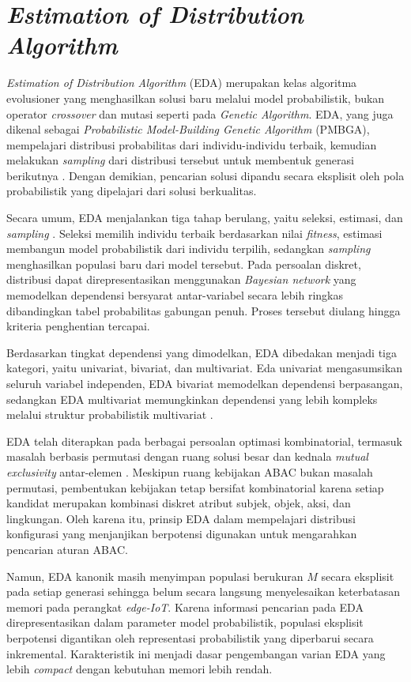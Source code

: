\section{\textit{Estimation of Distribution Algorithm}}

\textit{Estimation of Distribution Algorithm} (EDA) merupakan kelas algoritma evolusioner yang menghasilkan solusi baru melalui model probabilistik, bukan operator \textit{crossover} dan mutasi seperti pada \textit{Genetic Algorithm}.
EDA, yang juga dikenal sebagai \textit{Probabilistic Model-Building Genetic Algorithm} (PMBGA)\label{first:pmbga}, mempelajari distribusi probabilitas dari individu-individu terbaik, kemudian melakukan \textit{sampling} dari distribusi tersebut untuk membentuk generasi berikutnya \parencite{larranaga_estimation_2024,lemtenneche_estimation_2023}.
Dengan demikian, pencarian solusi dipandu secara eksplisit oleh pola probabilistik yang dipelajari dari solusi berkualitas.

Secara umum, EDA menjalankan tiga tahap berulang, yaitu seleksi, estimasi, dan \textit{sampling} \parencite{larranaga_estimation_2024}.
Seleksi memilih individu terbaik berdasarkan nilai \textit{fitness}, estimasi membangun model probabilistik dari individu terpilih, sedangkan \textit{sampling} menghasilkan populasi baru dari model tersebut.
Pada persoalan diskret, distribusi dapat direpresentasikan menggunakan \textit{Bayesian network} yang memodelkan dependensi bersyarat antar-variabel secara lebih ringkas dibandingkan tabel probabilitas gabungan penuh.
Proses tersebut diulang hingga kriteria penghentian tercapai.

Berdasarkan tingkat dependensi yang dimodelkan, EDA dibedakan menjadi tiga kategori, yaitu univariat, bivariat, dan multivariat.
Eda univariat mengasumsikan seluruh variabel independen, EDA bivariat memodelkan dependensi berpasangan, sedangkan EDA multivariat memungkinkan dependensi yang lebih kompleks melalui struktur probabilistik multivariat \parencite{larranaga_estimation_2024}.

EDA telah diterapkan pada berbagai persoalan optimasi kombinatorial, termasuk masalah berbasis permutasi dengan ruang solusi besar dan kednala \textit{mutual exclusivity} antar-elemen \parencite{lemtenneche_estimation_2023}.
Meskipun ruang kebijakan ABAC bukan masalah permutasi, pembentukan kebijakan tetap bersifat kombinatorial karena setiap kandidat merupakan kombinasi diskret atribut subjek, objek, aksi, dan lingkungan.
Oleh karena itu, prinsip EDA dalam mempelajari distribusi konfigurasi yang menjanjikan berpotensi digunakan untuk mengarahkan pencarian aturan ABAC.

Namun, EDA kanonik masih menyimpan populasi berukuran $M$\label{first:label-m} secara eksplisit pada setiap generasi sehingga belum secara langsung menyelesaikan keterbatasan memori pada perangkat \textit{edge-IoT}.
Karena informasi pencarian pada EDA direpresentasikan dalam parameter model probabilistik, populasi eksplisit berpotensi digantikan oleh representasi probabilistik yang diperbarui secara inkremental.
Karakteristik ini menjadi dasar pengembangan varian EDA yang lebih \textit{compact} dengan kebutuhan memori lebih rendah.